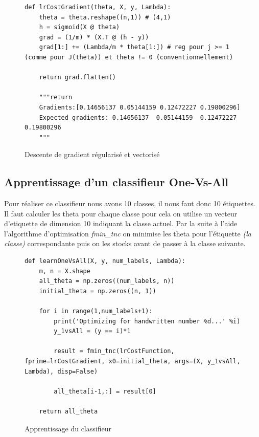 \begin{figure}[!h]
\begin{verbatim}
def lrCostGradient(theta, X, y, Lambda):
    theta = theta.reshape((n,1)) # (4,1)
    h = sigmoid(X @ theta)
    grad = (1/m) * (X.T @ (h - y))
    grad[1:] += (Lambda/m * theta[1:]) # reg pour j >= 1 (comme pour J(theta)) et theta != 0 (conventionnellement)

    return grad.flatten()

    """return 
    Gradients:[0.14656137 0.05144159 0.12472227 0.19800296]
    Expected gradients: 0.14656137  0.05144159  0.12472227  0.19800296
    """
\end{verbatim}   
\caption{Descente de gradient régularisé et vectorisé}
\end{figure}

\clearpage
\subsection{Apprentissage d'un classifieur One-Vs-All}

Pour réaliser ce classifieur nous avons 10 classes, il nous faut donc 10 étiquettes. Il faut calculer les theta pour chaque classe pour cela on utilise un vecteur d'etiquette de dimension 10 indiquant 
la classe actuel. Par la suite à l'aide l'algorithme d'optimisation \textit{fmin\_tnc} on minimise les theta pour l'étiquette \textit{(la classe)} correspondante puis on les stocks avant de passer à la 
classe suivante.

\begin{figure}[!h]
\begin{verbatim}
def learnOneVsAll(X, y, num_labels, Lambda):
    m, n = X.shape
    all_theta = np.zeros((num_labels, n))
    initial_theta = np.zeros((n, 1))

    for i in range(1,num_labels+1):
        print('Optimizing for handwritten number %d...' %i)
        y_1vsAll = (y == i)*1

        result = fmin_tnc(lrCostFunction, fprime=lrCostGradient, x0=initial_theta, args=(X, y_1vsAll, Lambda), disp=False)
        
        all_theta[i-1,:] = result[0]

    return all_theta
\end{verbatim}   
\caption{Apprentissage du classifieur}
\end{figure}
        

